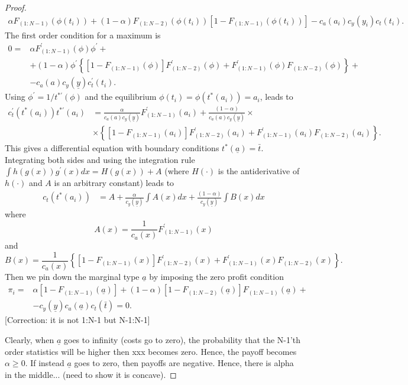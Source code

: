 \documentclass[12pt,]{article}
\newcommand\deadline{\bar{t}}
\newcommand\target{\underline{y}}
\newcommand\costs{c_a(a_i)c_y(y_i)c_t(t_i)}
\newcommand\marginaltype{\underline{a}}
\newcommand\mtype{\underline{a}}
\begin{document}
\begin{shaded}
\begin{proof}
\begin{align}
  \alpha F_{(1:N-1)}(\phi(t_i)) 
  + (1-\alpha) F_{(1:N-2)}(\phi(t_i))\left[1 - F_{(1:N-1)}(\phi(t_i))\right]
  - \costs.
\end{align}
The first order condition for a maximum \citep[see][]{moldovanu2001optimal} is
\begin{align} \label{foc0}
  0 = & \alpha F_{(1:N-1)}^{\prime}(\phi) \phi^{\prime} + \nonumber\\
    & + (1-\alpha)\phi^{\prime}\left\{
        \left[1 - F_{(1:N-1)}(\phi)\right]F_{(1:N-2)}^{\prime}(\phi)
        + F_{(1:N-1)}^{\prime}(\phi) F_{(1:N-2)}(\phi)\right\} + \nonumber\\
    & - c_{a}(a) c_{y}(\target) c_{t}^{\prime}(t_i).
\end{align}
Using $\phi^\prime =  1 / t^{*\prime}(\phi)$ and the equilibrium $\phi(t_i) = \phi(t^*(a_i)) = a_i$, leads to
\begin{align} \label{foc}
  c_{t}^{\prime}(t^{*}(a_i)) t^{*\prime}(a_i) 
      & = \frac{\alpha}{c_{a}(a) c_{y}(\target)} F_{(1:N-1)}^{\prime}(a_i)
        + \frac{(1-\alpha)}{c_{a}(a) c_{y}(\target)}\times \nonumber\\
      & \times\left\{\left[1 - F_{(1:N-1)}(a_i)\right]F_{(1:N-2)}^{\prime}(a_i)
        + F_{(1:N-1)}^{\prime}(a_i) F_{(1:N-2)}(a_i)\right\}.
\end{align}
This gives a differential equation with boundary conditions $t^*(\mtype) = \deadline$. 
Integrating both sides and using the integration rule $\int h(g(x)) g^\prime(x) dx = H(g(x)) + A$ (where $H(\cdot)$ is the antiderivative of $h(\cdot)$ and $A$ is an arbitrary constant) leads to
\begin{align} \label{foc}
  c_{t}(t^{*}(a_i))
      & = A + \frac{\alpha}{c_{y}(\target)} \int A(x) dx
        + \frac{(1-\alpha)}{c_{y}(\target)} \int B(x) dx
\end{align}
where 
\[
  A(x) = \frac{1}{c_{a}(x)} F_{(1:N-1)}^{\prime}(x)
\]
and
\[
  B(x) = \frac{1}{c_{a}(x)} \left\{
      \left[1- F_{(1:N-1)}(x)\right]F_{(1:N-2)}^{\prime}(x)
      + F_{(1:N-1)}^{\prime}(x) F_{(1:N-2)}(x)
    \right\}.
\]
Then we pin down the marginal type $\mtype$ by imposing the zero profit condition
\begin{align}
  \pi_i = & \alpha \left[1 - F_{(1:N-1)}(\mtype)\right] 
      + (1-\alpha) \left[1- F_{(1:N-2)}(\mtype)\right]F_{(1:N-1)}(\mtype) + \nonumber\\
    & - c_y(\target) c_a(\mtype) c_{t}(\deadline) = 0.
\end{align}
[Correction: it is not 1:N-1 but N-1:N-1]

Clearly, when $\marginaltype$ goes to infinity (costs go to zero), the probability that the N-1'th order statistics will be higher then xxx becomes zero. Hence, the payoff becomes $\alpha \geq 0$. If instead $\marginaltype$ goes to zero, then payoffs are negative. Hence, there is alpha in the middle... (need to show it is concave). 
\end{proof}
\end{shaded}
\end{document}
